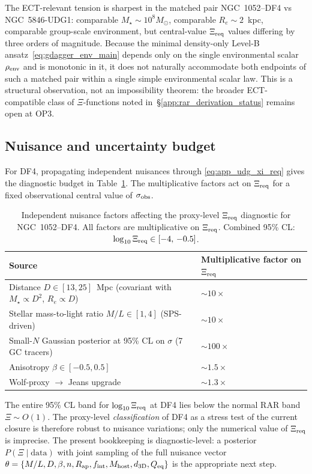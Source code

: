 The ECT-relevant tension is sharpest in the matched pair
NGC~1052--DF4 vs NGC~5846-UDG1: comparable $M_\star\sim 10^{8}M_\odot$,
comparable $R_e\sim 2$~kpc, comparable group-scale environment, but
central-value $\Xi_{\rm req}$ values differing by three orders of
magnitude.  Because the minimal density-only Level-B
ansatz~\eqref{eq:gdagger_env_main} depends only on the single
environmental scalar $\rho_{\rm env}$ and is monotonic in it, it
does not naturally accommodate both endpoints of such a matched
pair within a single simple environmental scalar law.  This is a
structural observation, not an impossibility theorem: the broader
ECT-compatible class of $\Xi$-functions noted
in~\S\ref{app:rar_derivation_status} remains open at OP3.

\subsection{Nuisance and uncertainty budget}
\label{app:udg:nuisance}

For DF4, propagating independent nuisances through
\eqref{eq:app_udg_xi_req} gives the diagnostic budget in
Table~\ref{tab:udg_nuisance}.  The multiplicative factors act on
$\Xi_{\rm req}$ for a fixed observational central value of
$\sigma_{\rm obs}$.

\begin{longtable}{@{}l l@{}}
\caption{Independent nuisance factors affecting the proxy-level
$\Xi_{\rm req}$ diagnostic for NGC~1052--DF4.  All factors are
multiplicative on $\Xi_{\rm req}$.  Combined 95\% CL:
$\log_{10}\Xi_{\rm req}\in[-4,\,-0.5]$.}
\label{tab:udg_nuisance}\\
\toprule
Source & Multiplicative factor on $\Xi_{\rm req}$\\
\midrule
\endfirsthead
\bottomrule
\endfoot
Distance $D\in[13,25]$~Mpc (covariant with $M_\star\propto D^2$, $R_e\propto D$) & $\sim 10\times$\\
Stellar mass-to-light ratio $M/L\in[1,4]$ (SPS-driven) & $\sim 10\times$\\
Small-$N$ Gaussian posterior at 95\% CL on $\sigma$ (7 GC tracers) & $\sim 100\times$\\
Anisotropy $\beta\in[-0.5,0.5]$ & $\sim 1.5\times$\\
Wolf-proxy $\to$ Jeans upgrade & $\sim 1.3\times$\\
\end{longtable}

The entire 95\% CL band for $\log_{10}\Xi_{\rm req}$ at DF4 lies
below the normal RAR band $\Xi\sim O(1)$.  The proxy-level
\emph{classification} of DF4 as a stress test of the current
closure is therefore robust to nuisance variations; only the
numerical value of $\Xi_{\rm req}$ is imprecise.  The present
bookkeeping is diagnostic-level: a posterior $P(\Xi\mid\text{data})$
with joint sampling of the full nuisance vector
$\theta=\{M/L,D,\beta,n,R_{\rm ap},f_{\rm int},M_{\rm host},d_{\rm 3D},Q_{\rm eq}\}$
is the appropriate next step.

